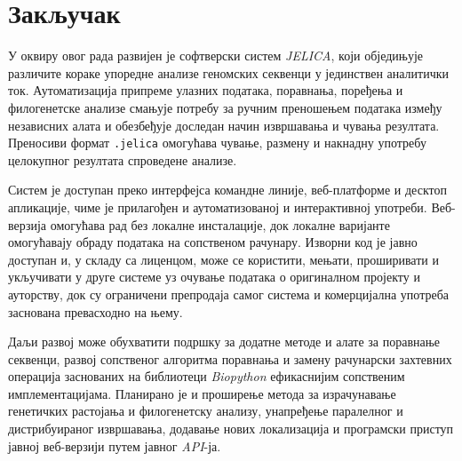 \documentclass[12pt,oneside]{memoir}
\begin{document}
\chapter{Закључак}
\label{ch:conclusion}
У оквиру овог рада развијен је софтверски систем \textit{JELICA}, који обједињује различите кораке упоредне анализе геномских секвенци у јединствен аналитички ток. Аутоматизација припреме улазних података, поравнања, поређења и филогенетске анализе смањује потребу за ручним преношењем података између независних алата и обезбеђује доследан начин извршавања и чувања резултата. Преносиви формат \texttt{.jelica} омогућава чување, размену и накнадну употребу целокупног резултата спроведене анализе.

Систем је доступан преко интерфејса командне линије, веб-платформе и десктоп апликације, чиме је прилагођен и аутоматизованој и интерактивној употреби. Веб-верзија омогућава рад без локалне инсталације, док локалне варијанте омогућавају обраду података на сопственом рачунару. Изворни код је јавно доступан и, у складу са лиценцом, може се користити, мењати, проширивати и укључивати у друге системе уз очување података о оригиналном пројекту и ауторству, док су ограничени препродаја самог система и комерцијална употреба заснована превасходно на њему.

Даљи развој може обухватити подршку за додатне методе и алате за поравнање секвенци, развој сопственог алгоритма поравнања и замену рачунарски захтевних операција заснованих на библиотеци \textit{Biopython} ефикаснијим сопственим имплементацијама. Планирано је и проширење метода за израчунавање генетичких растојања и филогенетску анализу, унапређење паралелног и дистрибуираног извршавања, додавање нових локализација и програмски приступ јавној веб-верзији путем јавног \textit{API}-ја.

\literatura

\backmatter
\end{document}
